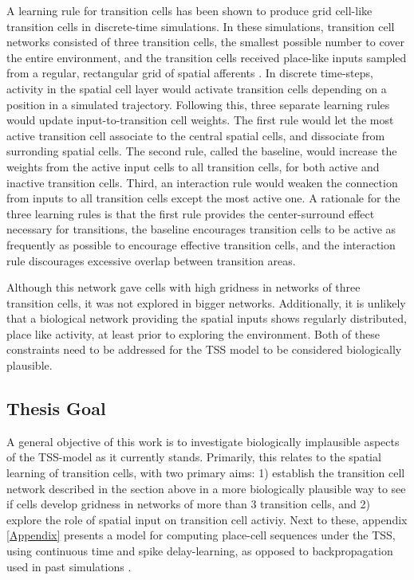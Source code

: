 \documentclass{article}
\begin{document}
    A learning rule for transition cells has been shown to produce grid cell-like transition cells in discrete-time simulations. In these simulations, transition cell networks consisted of three transition cells, the smallest possible number to cover the entire environment, and the transition cells received place-like inputs sampled from a regular, rectangular grid of spatial afferents \parencite{Waniek2017}. In discrete time-steps, activity in the spatial cell layer would activate transition cells depending on a position in a simulated trajectory. Following this, three separate learning rules would update input-to-transition cell weights. The first rule would let the most active transition cell associate to the central spatial cells, and dissociate from surronding spatial cells. The second rule, called the baseline, would increase the weights from the active input cells to all transition cells, for both active and inactive transition cells. Third, an interaction rule would weaken the connection from inputs to all transition cells except the most active one.
    A rationale for the three learning rules is that the first rule provides the center-surround effect necessary for transitions, the baseline encourages transition cells to be active as frequently as possible to encourage effective transition cells, and the interaction rule discourages excessive overlap between transition areas.
    
    Although this network gave cells with high gridness in networks of three transition cells, it was not explored in bigger networks. Additionally, it is unlikely that a biological network providing the spatial inputs shows regularly distributed, place like activity, at least prior to exploring the environment. Both of these constraints need to be addressed for the TSS model to be considered biologically plausible.

    \subsection{Thesis Goal} \label{Thesis Goal}
    A general objective of this work is to investigate biologically implausible aspects of the TSS-model as it currently stands. Primarily, this relates to the spatial learning of transition cells, with two primary aims: 1) establish the transition cell network described in the section above in a more biologically plausible way to see if cells develop gridness in networks of more than 3 transition cells, and 2) explore the role of spatial input on transition cell activiy. Next to these, appendix \ref{Appendix} presents a model for computing place-cell sequences under the TSS, using continuous time and spike delay-learning, as opposed to backpropagation used in past simulations \parencite{Waniek2018}.
\end{document}
